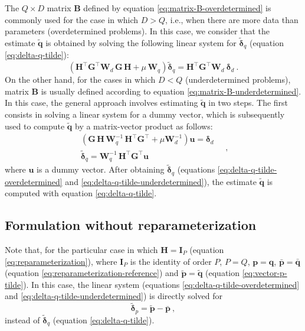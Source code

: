 The $Q \times D$ matrix $\mathbf{B}$ defined by equation \ref{eq:matrix-B-overdetermined} is commonly used for the case 
in which $D > Q$, i.e., when there are more data than parameters (overdetermined problems).
In this case, we consider that the estimate $\tilde{\mathbf{q}}$ is obtained by solving the following linear system
for $\tilde{\boldsymbol{\delta}}_{q}$ (equation \ref{eq:delta-q-tilde}):
\begin{equation}
	\left( \mathbf{H}^{\top} \mathbf{G}^{\top} \mathbf{W}_{d} \, \mathbf{G} \, \mathbf{H} + 
	\mu \, \mathbf{W}_{q} \right) 
	\tilde{\boldsymbol{\delta}}_{q} = 
	\mathbf{H}^{\top} \mathbf{G}^{\top} \mathbf{W}_{d} \: 
	\boldsymbol{\delta}_{d} \: .
	\label{eq:delta-q-tilde-overdetermined}
\end{equation}
On the other hand, for the cases in which $D < Q$ (underdetermined problems), matrix $\mathbf{B}$ is 
usually defined according to equation \ref{eq:matrix-B-underdetermined}. In this case, the general approach involves 
estimating $\tilde{\mathbf{q}}$ in two steps. The first consists in solving a linear system 
for a dummy vector, which is subsequently used to compute $\tilde{\mathbf{q}}$ by a matrix-vector product as follows:
\begin{equation}
	\begin{split}
		\left( \mathbf{G} \, \mathbf{H} \, \mathbf{W}_{q}^{-1} \,
		\mathbf{H}^{\top}\mathbf{G}^{\top} + \mu \mathbf{W}_{d}^{-1} \right)  
		\mathbf{u} = \boldsymbol{\delta}_{d} \\
		\tilde{\boldsymbol{\delta}}_{q} = \mathbf{W}_{q}^{-1} \, \mathbf{H}^{\top} \mathbf{G}^{\top} \mathbf{u}
	\end{split} \quad ,
	\label{eq:delta-q-tilde-underdetermined}
\end{equation}
where $\mathbf{u}$ is a dummy vector.
After obtaining $\tilde{\boldsymbol{\delta}}_{q}$ (equations \ref{eq:delta-q-tilde-overdetermined} and \ref{eq:delta-q-tilde-underdetermined}),
the estimate $\tilde{\mathbf{q}}$ is computed with equation \ref{eq:delta-q-tilde}.

\subsection{Formulation without reparameterization}
\label{subsec:formulation-without-reparameterization}

Note that, for the particular case in which $\mathbf{H} = \mathbf{I}_{P}$ (equation \ref{eq:reparameterization}), 
where $\mathbf{I}_{P}$ is the identity of order $P$, 
$P = Q$, $\mathbf{p} = \mathbf{q}$, $\bar{\mathbf{p}} = \bar{\mathbf{q}}$ (equation \ref{eq:reparameterization-reference}) and 
$\tilde{\mathbf{p}} = \tilde{\mathbf{q}}$ (equation \ref{eq:vector-p-tilde}).
In this case, the linear system (equations \ref{eq:delta-q-tilde-overdetermined} and \ref{eq:delta-q-tilde-underdetermined}) is directly 
solved for 
\begin{equation}
	\tilde{\boldsymbol{\delta}}_{p} = \tilde{\mathbf{p}} - \bar{\mathbf{p}} \: ,
	\label{eq:delta-p-tilde}
\end{equation}
instead of $\tilde{\boldsymbol{\delta}}_{q}$ (equation \ref{eq:delta-q-tilde}).

